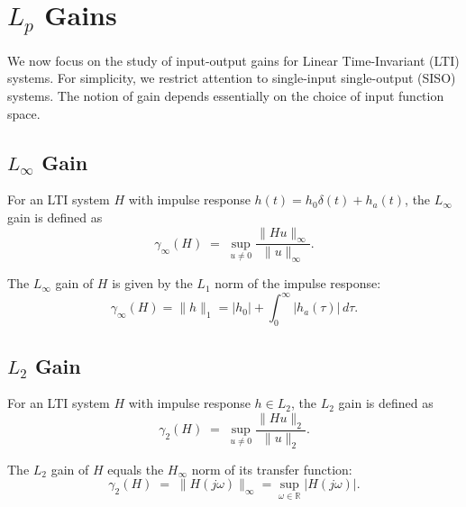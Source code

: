 \section{\texorpdfstring{$L_p$ Gains}{Lp Gains}}

We now focus on the study of input-output gains for Linear Time-Invariant (LTI) systems.  
For simplicity, we restrict attention to single-input single-output (SISO) systems.  
The notion of gain depends essentially on the choice of input function space.

\subsection{$L_\infty$ Gain}

\begin{definition}
For an LTI system $H$ with impulse response $h(t) = h_0 \delta(t) + h_a(t)$, the $L_\infty$ gain is defined as
\begin{equation}
\gamma_\infty(H) \;=\; \sup_{u \neq 0} \frac{\|Hu\|_\infty}{\|u\|_\infty}.
\end{equation}
\end{definition}

\begin{theorem}
The $L_\infty$ gain of $H$ is given by the $L_1$ norm of the impulse response:
\begin{equation}
\gamma_\infty(H) = \|h\|_1 = |h_0| + \int_0^\infty |h_a(\tau)| \, d\tau.
\end{equation}
\end{theorem}

\subsection{$L_2$ Gain}

\begin{definition}[$L_2$ Gain]
For an LTI system $H$ with impulse response $h \in L_2$, the $L_2$ gain is defined as
\begin{equation}
\gamma_2(H) \;=\; \sup_{u \neq 0} \frac{\|Hu\|_2}{\|u\|_2}.
\end{equation}
\end{definition}

\begin{theorem}
The $L_2$ gain of $H$ equals the $H_\infty$ norm of its transfer function:
\begin{equation}
\gamma_2(H) \;=\; \|H(j\omega)\|_\infty 
= \sup_{\omega \in \mathbb{R}} |H(j\omega)|.
\end{equation}
\end{theorem}

